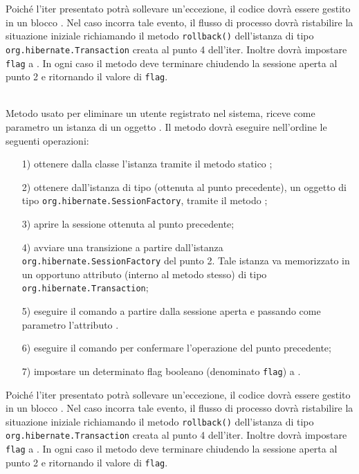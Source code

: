 \begin{description}
Poiché l'iter presentato potrà sollevare un'eccezione, il codice dovrà essere gestito in un blocco . Nel caso incorra tale evento, il flusso di processo dovrà ristabilire la situazione iniziale richiamando il metodo \texttt{rollback()} dell'istanza di tipo \texttt{org.hibernate.Transaction} creata al punto 4 dell'iter. Inoltre dovrà impostare \texttt{flag} a . In ogni caso il metodo deve terminare chiudendo la sessione aperta al punto 2 e ritornando il valore di \texttt{flag}.

	\item{}\\
	Metodo usato per eliminare un utente registrato nel sistema, riceve come parametro un istanza di un oggetto . Il metodo dovrà eseguire nell'ordine le seguenti operazioni:
		\begin{itemize}
			\item[1)] ottenere dalla classe  l'istanza tramite il metodo statico ;
			\item[2)] ottenere dall'istanza di tipo (ottenuta al punto precedente), un oggetto di tipo \texttt{org.hibernate.SessionFactory}, tramite il metodo ;
			\item[3)] aprire la sessione ottenuta al punto precedente;
			\item[4)] avviare una transizione a partire dall'istanza \texttt{org.hibernate.SessionFactory} del punto 2. Tale istanza va memorizzato in un opportuno attributo (interno al metodo stesso) di tipo \texttt{org.hibernate.Transaction};
			\item[5)] eseguire il comando  a partire dalla sessione aperta e passando come parametro l'attributo .
			\item[6)] eseguire il comando  per confermare l'operazione del punto precedente;
			\item[7)] impostare un determinato flag booleano (denominato \texttt{flag}) a .
		\end{itemize}
		
Poiché l'iter presentato potrà sollevare un'eccezione, il codice dovrà essere gestito in un blocco . Nel caso incorra tale evento, il flusso di processo dovrà ristabilire la situazione iniziale richiamando il metodo \texttt{rollback()} dell'istanza di tipo \texttt{org.hibernate.Transaction} creata al punto 4 dell'iter. Inoltre dovrà impostare \texttt{flag} a . In ogni caso il metodo deve terminare chiudendo la sessione aperta al punto 2 e ritornando il valore di \texttt{flag}.


\end{description}
